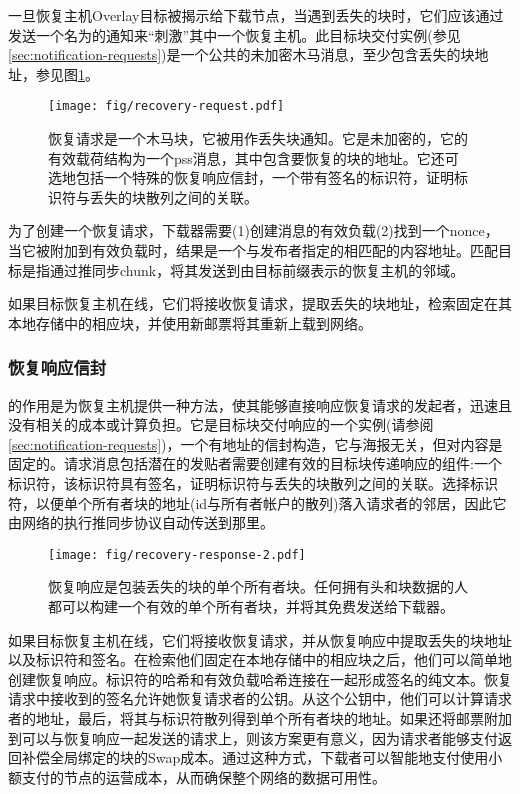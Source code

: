 一旦恢复主机Overlay目标被揭示给下载节点，当遇到丢失的块时，它们应该通过发送一个名为的通知来“刺激”其中一个恢复主机。此目标块交付实例(参见\ref{sec:notification-requests})是一个公共的未加密木马消息，至少包含丢失的块地址，参见图\ref{fig:recovery-request}。

\begin{figure}[htbp]
  \centering
  \texttt{[image: fig/recovery-request.pdf]}
  \caption[恢复请求\statusgreen]{恢复请求是一个木马块，它被用作丢失块通知。它是未加密的，它的有效载荷结构为一个pss消息，其中包含要恢复的块的地址。它还可选地包括一个特殊的恢复响应信封，一个带有签名的标识符，证明标识符与丢失的块散列之间的关联。}
  \label{fig:recovery-request}
\end{figure}

为了创建一个恢复请求，下载器需要(1)创建消息的有效负载(2)找到一个nonce，当它被附加到有效负载时，结果是一个与发布者指定的相匹配的内容地址。匹配目标是指通过推同步chunk，将其发送到由目标前缀表示的恢复主机的邻域。

如果目标恢复主机在线，它们将接收恢复请求，提取丢失的块地址，检索固定在其本地存储中的相应块，并使用新邮票将其重新上载到网络。

\subsubsection{恢复响应信封}

的作用是为恢复主机提供一种方法，使其能够直接响应恢复请求的发起者，迅速且没有相关的成本或计算负担。它是目标块交付响应的一个实例(请参阅\ref{sec:notification-requests})，一个有地址的信封构造，它与海报无关，但对内容是固定的。请求消息包括潜在的发贴者需要创建有效的目标块传递响应的组件:一个标识符，该标识符具有签名，证明标识符与丢失的块散列之间的关联。选择标识符，以便单个所有者块的地址(id与所有者帐户的散列)落入请求者的邻居，因此它由网络的执行推同步协议自动传送到那里。

\begin{figure}[htbp]
\centering
\texttt{[image: fig/recovery-response-2.pdf]}
\caption[恢复响应\statusgreen]{恢复响应是包装丢失的块的单个所有者块。任何拥有头和块数据的人都可以构建一个有效的单个所有者块，并将其免费发送给下载器。}
\label{fig:recovery-response}
\end{figure}

如果目标恢复主机在线，它们将接收恢复请求，并从恢复响应中提取丢失的块地址以及标识符和签名。在检索他们固定在本地存储中的相应块之后，他们可以简单地创建恢复响应。标识符的哈希和有效负载哈希连接在一起形成签名的纯文本。恢复请求中接收到的签名允许她恢复请求者的公钥。从这个公钥中，他们可以计算请求者的地址，最后，将其与标识符散列得到单个所有者块的地址。如果还将邮票附加到可以与恢复响应一起发送的请求上，则该方案更有意义，因为请求者能够支付返回补偿全局绑定的块的Swap成本。通过这种方式，下载者可以智能地支付使用小额支付的节点的运营成本，从而确保整个网络的数据可用性。



